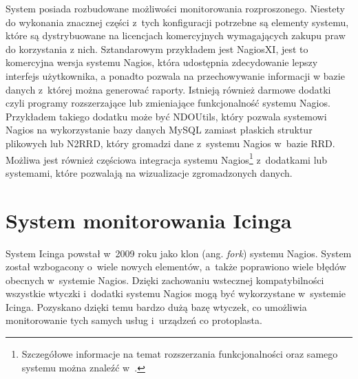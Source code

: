 System posiada rozbudowane możliwości monitorowania
rozproszonego. Niestety do wykonania znacznej części z~tych
konfiguracji potrzebne są elementy systemu, które są dystrybuowane na
licencjach komercyjnych wymagających zakupu praw do korzystania z
nich. Sztandarowym przykładem jest NagiosXI, jest to komercyjna wersja
systemu Nagios, która udostępnia zdecydowanie lepszy interfejs
użytkownika, a ponadto pozwala na przechowywanie informacji w bazie
danych z~której można generować raporty. Istnieją również darmowe
dodatki czyli programy rozszerzające lub zmieniające funkcjonalność
systemu Nagios. Przykładem takiego dodatku może być NDOUtils, który
pozwala systemowi Nagios na wykorzystanie bazy danych MySQL zamiast
płaskich struktur plikowych lub N2RRD, który gromadzi dane z~systemu
Nagios w~bazie RRD. Możliwa jest również częściowa integracja systemu
Nagios\footnote{Szczegółowe informacje na temat rozszerzania
  funkcjonalności oraz samego systemu można znaleźć
  w~\cite{www:Nagios}.}  z~dodatkami lub systemami, które pozwalają na
wizualizacje zgromadzonych danych.

\section[Icinga][System monitorowania Icinga]{System monitorowania Icinga}
\label{subsec:Icinga}

System Icinga powstał w~2009 roku jako klon (ang. {\em fork}) systemu
Nagios. System został wzbogacony o~wiele nowych elementów, a~także
poprawiono wiele błędów obecnych w~systemie Nagios. Dzięki zachowaniu
wstecznej kompatybilności wszystkie wtyczki i~dodatki
systemu Nagios mogą być wykorzystane w~systemie Icinga. Pozyskano
dzięki temu bardzo dużą bazę wtyczek, co umożliwia monitorowanie tych
samych usług i~urządzeń co protoplasta.

